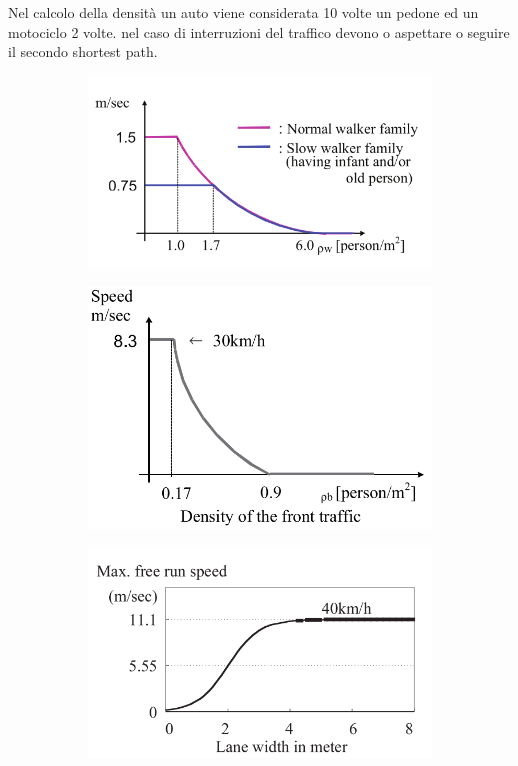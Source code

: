Nel calcolo della densità un auto viene considerata 10 volte un pedone ed un motociclo 2 volte.
nel caso di interruzioni del traffico devono o aspettare o seguire il secondo shortest path.

\begin{figure}[ht]
    \centering
    \begin{subfigure}{0.45\textwidth}
        \includegraphics[width=\textwidth]{images/speed_GOTO.png}
        \caption{}
        \label{fig:adaads}
    \end{subfigure}
    \begin{subfigure}{0.45\textwidth}
        \includegraphics[width=\textwidth]{images/speed_GOTO_motocicli.png}
        \caption{}
        \label{fig:ssadada}
    \end{subfigure}
    \begin{subfigure}{0.45\textwidth}
        \includegraphics[width=\textwidth]{images/speed_GOTO_auto.png}

\end{subfigure}
\end{figure}
